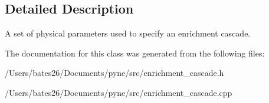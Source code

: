 \subsection{Detailed Description}
A set of physical parameters used to specify an enrichment cascade. 

The documentation for this class was generated from the following files\+:\begin{DoxyCompactItemize}
\item 
/\+Users/bates26/\+Documents/pyne/src/enrichment\+\_\+cascade.\+h\item 
/\+Users/bates26/\+Documents/pyne/src/enrichment\+\_\+cascade.\+cpp\end{DoxyCompactItemize}

